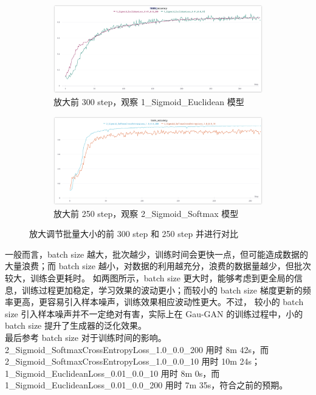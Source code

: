\documentclass{article}
\begin{document}
\begin{figure}[htbp]
	\flushleft
	\centering
	\begin{subfigure}{0.475\textwidth}
		\centering
		\includegraphics[width=1\textwidth]{../pics/学习率放大1.jpg}
		\caption{放大前 300 step，观察 1\_Sigmoid\_Euclidean 模型}
		\label{fig:13a}
	\end{subfigure}
	\begin{subfigure}{0.475\textwidth}
		\centering
		\includegraphics[width=1\textwidth]{../pics/学习率放大2.jpg}
		\caption{放大前 250 step，观察 2\_Sigmoid\_Softmax 模型}
		\label{fig:13b}
	\end{subfigure}
	\caption{放大调节批量大小的前 300 step 和 250 step 并进行对比}
	\label{fig:13}
\end{figure}

一般而言，batch size 越大，批次越少，训练时间会更快一点，但可能造成数据的大量浪费；而 batch size 越小，对数据的利用越充分，浪费的数据量越少，但批次较大，训练会更耗时。
如两图所示，batch size 更大时，能够考虑到更全局的信息，训练过程更加稳定，学习效果的波动更小；而较小的 batch size 梯度更新的频率更高，更容易引入样本噪声，训练效果相应波动性更大。不过，
较小的 batch size 引入样本噪声并不一定绝对有害，实际上在 Gau-GAN 的训练过程中，小的 batch size 提升了生成器的泛化效果。\\
最后参考 batch size 对于训练时间的影响。2\_Sigmoid\_SoftmaxCrossEntropyLoss\_1.0\_0.0\_200 用时 8m 42s，而 2\_Sigmoid\_SoftmaxCrossEntropyLoss\_1.0\_0.0\_10 用时 10m 24s；
1\_Sigmoid\_EuclideanLoss\_0.01\_0.0\_10 用时 8m 0s，而 1\_Sigmoid\_EuclideanLoss\_0.01\_0.0\_200 用时 7m 35s，符合之前的预期。
\end{document}
